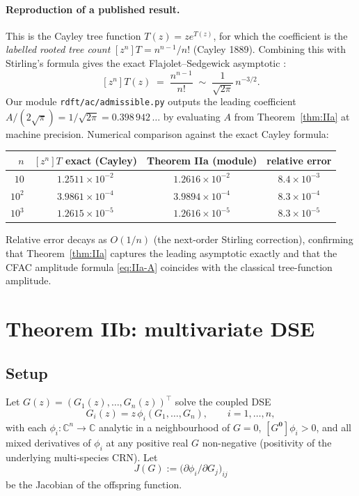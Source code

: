 \documentclass[11pt,a4paper]{article}
\newcommand{\C}{\mathbb{C}}
\theoremstyle{plain}
\theoremstyle{definition}
\begin{document}
\paragraph{Reproduction of a published result.}
This is the Cayley tree function $T(z) = z e^{T(z)}$, for which the
coefficient is the \emph{labelled rooted tree count}
$[z^n] T = n^{n-1}/n!$ (Cayley 1889).  Combining this with Stirling's
formula gives the exact Flajolet--Sedgewick asymptotic
\citep[Prop.~IV.3]{FlajoletSedgewick}:
\[
  [z^n] T(z) \;=\; \frac{n^{n-1}}{n!} \;\sim\; \frac{1}{\sqrt{2\pi}}\, n^{-3/2}.
\]
Our module \texttt{rdft/ac/admissible.py} outputs the leading
coefficient $A/(2\sqrt{\pi}) = 1/\sqrt{2\pi} = 0.398\,942\,\ldots$
by evaluating $A$ from Theorem~\ref{thm:IIa} at machine precision.
Numerical comparison against the exact Cayley formula:

\begin{center}
\begin{tabular}{rccc}
\toprule
$n$ & $[z^n] T$ exact (Cayley) & Theorem IIa (module) & relative error \\
\midrule
$10$      & $1.2511\times 10^{-2}$  & $1.2616\times 10^{-2}$   & $8.4 \times 10^{-3}$ \\
$10^2$    & $3.9861\times 10^{-4}$  & $3.9894\times 10^{-4}$   & $8.3 \times 10^{-4}$ \\
$10^3$    & $1.2615\times 10^{-5}$  & $1.2616\times 10^{-5}$   & $8.3 \times 10^{-5}$ \\
\bottomrule
\end{tabular}
\end{center}

Relative error decays as $O(1/n)$ (the next-order Stirling
correction), confirming that Theorem~\ref{thm:IIa} captures the
leading asymptotic exactly and that the CFAC amplitude formula
\eqref{eq:IIa-A} coincides with the classical tree-function
amplitude.

\section{Theorem IIb: multivariate DSE}
\label{sec:IIb}

\subsection{Setup}

Let $G(z) = (G_1(z), \dots, G_n(z))^\top$ solve the coupled DSE
\begin{equation}
\label{eq:DSE-IIb}
  G_i(z) = z\, \phi_i(G_1, \dots, G_n), \qquad i = 1, \dots, n,
\end{equation}
with each $\phi_i : \C^n \to \C$ analytic in a neighbourhood of
$G = 0$, $[G^{\mathbf{0}}] \phi_i > 0$, and all mixed derivatives of
$\phi_i$ at any positive real $G$ non-negative (positivity of the
underlying multi-species CRN).  Let
\[
  J(G) := \bigl(\partial\phi_i / \partial G_j\bigr)_{ij}
\]
be the Jacobian of the offspring function.
\end{document}
